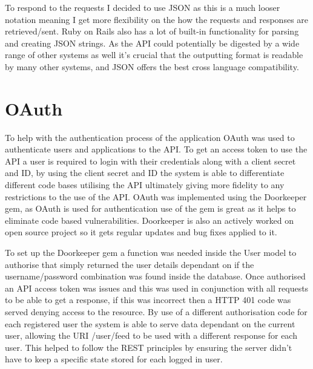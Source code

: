 		To respond to the requests I decided to use JSON as this is a much looser notation meaning I get more flexibility on the how the requests and responses are retrieved/sent. Ruby on Rails also has a lot of built-in functionality for parsing and creating JSON strings. As the API could potentially be digested by a wide range of other systems as well it's crucial that the outputting format is readable by many other systems, and JSON offers the best cross language compatibility. 

	\section{OAuth}
		To help with the authentication process of the application OAuth was used to authenticate users and applications to the API. To get an access token to use the API a user is required to login with their credentials along with a client secret and ID, by using the client secret and ID the system is able to differentiate different code bases utilising the API ultimately giving more fidelity to  any restrictions to the use of the API. OAuth was implemented using the Doorkeeper gem, as OAuth is used for authentication use of the gem is great as it helps to eliminate code based vulnerabilities. Doorkeeper is also an actively worked on open source project so it gets regular updates and bug fixes applied to it. 

		To set up the Doorkeeper gem a function was needed inside the User model to authorise that simply returned the user details dependant on if the username/password combination was found inside the database. Once authorised an API access token was issues and this was used in conjunction with all requests to be able to get a response, if this was incorrect then a HTTP 401 code was served denying access to the resource. By use of a different authorisation code for each registered user the system is able to serve data dependant on the current user, allowing the URI /user/feed to be used with a different response for each user. This helped to follow the REST principles by ensuring  the server didn't have to keep a specific state stored for each logged in user. 

